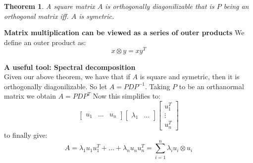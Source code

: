 \documentclass[titlepage]{article}
\newcommand{\tens}[1]{%
  \mathbin{\mathop{\otimes}\limits_{#1}}%
}
\newtheorem{thm}{Theorem}[subsection]
\numberwithin{equation}{subsection}
\begin{document}
\begin{thm}
A square matrix $A$ is orthogonally diagonilizable that is $P$ being an orthogonal matrix iff. $A$ is symetric.
\end{thm}

\begin{remark}\textbf{Matrix multiplication can be viewed as a series of outer products}
We define an outer product as:
$$ x\tens{} y = xy^{T}$$
\end{remark}

\begin{tcolorbox}
\textbf{A useful tool: Spectral decomposition}
\\

Given our above theorem, we have that if $A$ is square and symetric, then it is orthogonally diagonilizable. So let $A = PDP^{-1}$. Taking $P$ to be an orthanormal matrix we obtain $A = PDP^{T}$ Now this simplifies to:
$$\begin{bmatrix}
    u_{1} & \hdots & u_{n}
\end{bmatrix}\begin{bmatrix}
    \lambda_{1} & \hdots
\end{bmatrix} \begin{bmatrix}
    u_{1}^{T}\\
    \vdots \\
    u_{n}^{T}
\end{bmatrix}$$
to finally give:
$$A = \lambda_{1}u_{1}u_{1}^{T} + \hdots + \lambda_{n}u_{n}u_{n}^{T} = \sum_{i=1}^{n}\lambda_{i}u_{i} \tens{} u_{i}$$
\end{tcolorbox}
\end{document}
